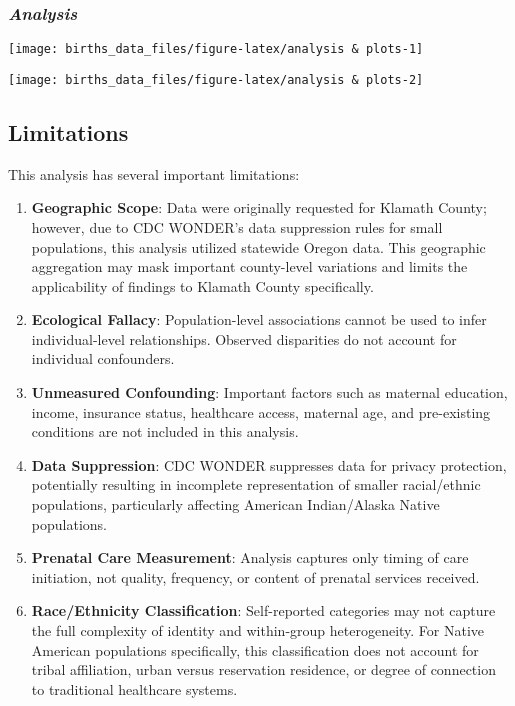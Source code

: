 \documentclass[
]{article}
\begin{document}
\hypertarget{analysis}{%
\subsubsection{\texorpdfstring{\emph{Analysis}}{Analysis}}\label{analysis}}

\begin{center}\texttt{[image: births\_data\_files/figure-latex/analysis \& plots-1]} \end{center}

\begin{center}\texttt{[image: births\_data\_files/figure-latex/analysis \& plots-2]} \end{center}

\hypertarget{limitations}{%
\subsection{Limitations}\label{limitations}}

This analysis has several important limitations:

\begin{enumerate}
\def\labelenumi{\arabic{enumi}.}
\item
  \textbf{Geographic Scope}: Data were originally requested for Klamath
  County; however, due to CDC WONDER's data suppression rules for small
  populations, this analysis utilized statewide Oregon data. This
  geographic aggregation may mask important county-level variations and
  limits the applicability of findings to Klamath County specifically.
\item
  \textbf{Ecological Fallacy}: Population-level associations cannot be
  used to infer individual-level relationships. Observed disparities do
  not account for individual confounders.
\item
  \textbf{Unmeasured Confounding}: Important factors such as maternal
  education, income, insurance status, healthcare access, maternal age,
  and pre-existing conditions are not included in this analysis.
\item
  \textbf{Data Suppression}: CDC WONDER suppresses data for privacy
  protection, potentially resulting in incomplete representation of
  smaller racial/ethnic populations, particularly affecting American
  Indian/Alaska Native populations.
\item
  \textbf{Prenatal Care Measurement}: Analysis captures only timing of
  care initiation, not quality, frequency, or content of prenatal
  services received.
\item
  \textbf{Race/Ethnicity Classification}: Self-reported categories may
  not capture the full complexity of identity and within-group
  heterogeneity. For Native American populations specifically, this
  classification does not account for tribal affiliation, urban versus
  reservation residence, or degree of connection to traditional
  healthcare systems.
\end{enumerate}
\end{document}
